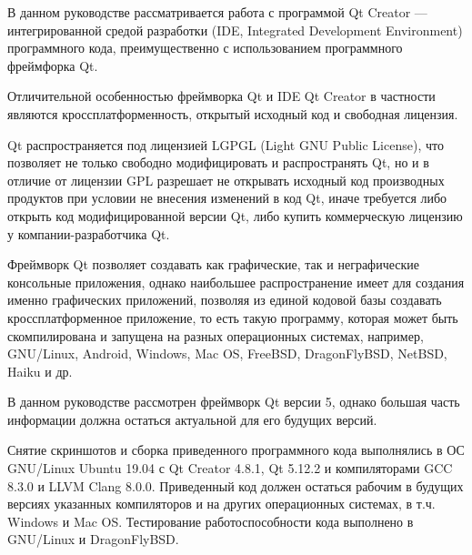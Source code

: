 
В данном руководстве рассматривается работа с программой Qt Creator — интегрированной средой разработки (IDE, Integrated Development Environment) программного кода, преимущественно с использованием программного фреймфорка Qt.

Отличительной особенностью фреймворка Qt и IDE Qt Creator в частности являются кроссплатформенность, открытый исходный код и свободная лицензия.

Qt распространяется под лицензией LGPGL (Light GNU Public License), что позволяет не только свободно модифицировать и распространять Qt, но и в отличие от лицензии GPL разрешает не открывать исходный код производных продуктов при условии не внесения изменений в код Qt, иначе требуется либо открыть код модифицированной версии Qt, либо купить коммерческую лицензию у компании-разработчика Qt.

Фреймворк Qt позволяет создавать как графические, так и неграфические консольные приложения, однако наибольшее распространение имеет для создания именно графических приложений, позволяя из единой кодовой базы создавать кроссплатформенное приложение, то есть такую программу, которая может быть скомпилирована и запущена на разных операционных системах, например, GNU/Linux, Android, Windows, Mac OS, FreeBSD, DragonFlyBSD, NetBSD, Haiku и др.

В данном руководстве рассмотрен фреймворк Qt версии 5, однако большая часть информации должна остаться актуальной для его будущих версий.

Снятие скриншотов и сборка приведенного программного кода выполнялись в ОС GNU/Linux Ubuntu 19.04 с Qt Creator 4.8.1, Qt 5.12.2 и компиляторами GCC 8.3.0 и LLVM Clang 8.0.0. Приведенный код должен остаться рабочим в будущих версиях указанных компиляторов и на других операционных системах, в т.ч. Windows и Mac OS. Тестирование работоспособности кода выполнено в GNU/Linux и DragonFlyBSD.

\clearpage
